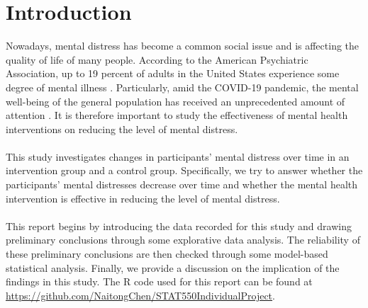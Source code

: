 

\section{Introduction}
Nowadays, mental distress has become a common social issue and is affecting the quality of life of many people. According to the American Psychiatric Association, up to 19 percent of adults in the United States experience some degree of mental illness \cite{apastat}. Particularly, amid the COVID-19 pandemic, the mental well-being of the general population has received an unprecedented amount of attention \cite{twenge2020mental}. It is therefore important to study the effectiveness of mental health interventions on reducing the level of mental distress.\\\\
This study investigates changes in participants' mental distress over time in an intervention group and a control group. Specifically, we try to answer whether the participants' mental distresses decrease over time and whether the mental health intervention is effective in reducing the level of mental distress.\\\\
This report begins by introducing the data recorded for this study and drawing preliminary conclusions through some explorative data analysis. The reliability of these preliminary conclusions are then checked through some model-based statistical analysis. Finally, we provide a discussion on the implication of the findings in this study. The R code used for this report can be found at \url{https://github.com/NaitongChen/STAT550IndividualProject}.

